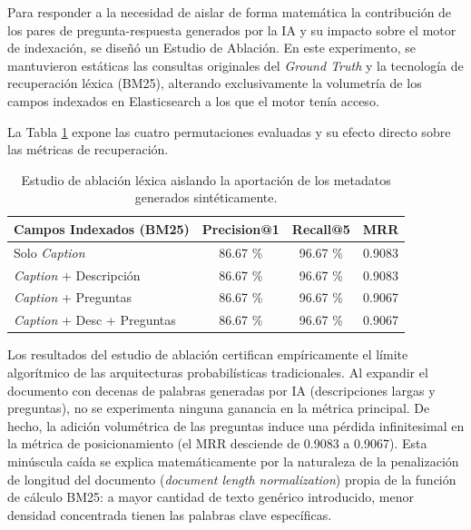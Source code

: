 \documentclass[a4paper]{report}
\renewcommand{\arraystretch}{1.5}
\begin{document}
Para responder a la necesidad de aislar de forma matemática la contribución de los pares de pregunta-respuesta generados por la IA y su impacto sobre el motor de indexación, se diseñó un Estudio de Ablación. En este experimento, se mantuvieron estáticas las consultas originales del \textit{Ground Truth} y la tecnología de recuperación léxica (BM25), alterando exclusivamente la volumetría de los campos indexados en Elasticsearch a los que el motor tenía acceso.

La Tabla \ref{tab:resultados_ablacion} expone las cuatro permutaciones evaluadas y su efecto directo sobre las métricas de recuperación.

\begin{table}[H]
    \centering
    \renewcommand{\arraystretch}{1.3} 
    \begin{tabular}{|p{5cm}|c|c|c|}
        \hline
        \textbf{Campos Indexados (BM25)} & \textbf{Precision@1} & \textbf{Recall@5} & \textbf{MRR} \\ 
        \hline
        Solo \textit{Caption} & 86.67 \% & 96.67 \% & 0.9083 \\ 
        \hline
        \textit{Caption} + Descripción & 86.67 \% & 96.67 \% & 0.9083 \\ 
        \hline
        \textit{Caption} + Preguntas & 86.67 \% & 96.67 \% & 0.9067 \\ 
        \hline
        \textit{Caption} + Desc + Preguntas & 86.67 \% & 96.67 \% & 0.9067 \\ 
        \hline
    \end{tabular}
    \caption{Estudio de ablación léxica aislando la aportación de los metadatos generados sintéticamente.}
    \label{tab:resultados_ablacion}
\end{table}

Los resultados del estudio de ablación certifican empíricamente el límite algorítmico de las arquitecturas probabilísticas tradicionales. Al expandir el documento con decenas de palabras generadas por IA (descripciones largas y preguntas), no se experimenta ninguna ganancia en la métrica principal. De hecho, la adición volumétrica de las preguntas induce una pérdida infinitesimal en la métrica de posicionamiento (el MRR desciende de 0.9083 a 0.9067). Esta minúscula caída se explica matemáticamente por la naturaleza de la penalización de longitud del documento (\textit{document length normalization}) propia de la función de cálculo BM25: a mayor cantidad de texto genérico introducido, menor densidad concentrada tienen las palabras clave específicas.
\end{document}
